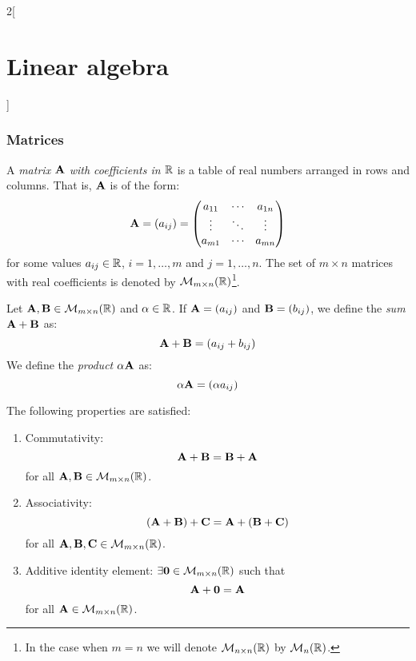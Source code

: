 \documentclass[../../../main.tex]{subfiles}
\begin{document}
\begin{multicols}{2}[\section{Linear algebra}]
  \subsubsection{Matrices}
  \begin{definition}[Matrix]
    A \textit{matrix $\boldsymbol{\mathrm{A}}$ with coefficients in $\mathbb{R}$} is a table of real numbers arranged in rows and columns. That is, $\boldsymbol{\mathrm{A}}$ is of the form:
    \begin{equation*}
      \boldsymbol{\mathrm{A}}=(a_{ij})=
      \begin{pmatrix}
        a_{11} & \cdots & a_{1n} \\
        \vdots & \ddots & \vdots \\
        a_{m1} & \cdots & a_{mn}
      \end{pmatrix}
    \end{equation*}
    for some values $a_{ij}\in\mathbb{R}$, $i=1,\ldots,m$ and $j=1,\ldots,n$. The set of $m\times n$ matrices with real coefficients is denoted by $\mathcal{M}_{m\times n}(\mathbb{R})$\footnote{In the case when $m=n$ we will denote $\mathcal{M}_{n\times n}(\mathbb{R})$ by $\mathcal{M}_n(\mathbb{R})$.}.
  \end{definition}
  \begin{definition}
    Let $\boldsymbol{\mathrm{A}},\boldsymbol{\mathrm{B}}\in\mathcal{M}_{m\times n}(\mathbb{R})$ and $\alpha\in\mathbb{R}$. If $\boldsymbol{\mathrm{A}}=(a_{ij})$ and $\boldsymbol{\mathrm{B}}=(b_{ij})$, we define the \textit{sum $\boldsymbol{\mathrm{A}}+\boldsymbol{\mathrm{B}}$} as: $$\boldsymbol{\mathrm{A}}+\boldsymbol{\mathrm{B}}=(a_{ij}+b_{ij})$$
    We define the \textit{product $\alpha\boldsymbol{\mathrm{A}}$} as: $$\alpha\boldsymbol{\mathrm{A}}=(\alpha a_{ij})$$
  \end{definition}
  \begin{prop}
    The following properties are satisfied:
    \begin{enumerate}
      \item Commutativity: $$\boldsymbol{\mathrm{A}}+\boldsymbol{\mathrm{B}}=\boldsymbol{\mathrm{B}}+\boldsymbol{\mathrm{A}}$$ for all $\boldsymbol{\mathrm{A}},\boldsymbol{\mathrm{B}}\in\mathcal{M}_{m\times n}(\mathbb{R})$.
      \item Associativity: $$(\boldsymbol{\mathrm{A}}+\boldsymbol{\mathrm{B}})+\boldsymbol{\mathrm{C}}=\boldsymbol{\mathrm{A}}+(\boldsymbol{\mathrm{B}}+\boldsymbol{\mathrm{C}})$$ for all $\boldsymbol{\mathrm{A}},\boldsymbol{\mathrm{B}},\boldsymbol{\mathrm{C}}\in\mathcal{M}_{m\times n}(\mathbb{R})$.
      \item Additive identity element: $\exists\boldsymbol{\mathrm{0}}\in\mathcal{M}_{m\times n}(\mathbb{R})$ such that $$\boldsymbol{\mathrm{A}}+\boldsymbol{\mathrm{0}}=\boldsymbol{\mathrm{A}}$$ for all $\boldsymbol{\mathrm{A}}\in\mathcal{M}_{m\times n}(\mathbb{R})$.

\end{enumerate}
\end{prop}
\end{multicols}
\end{document}
